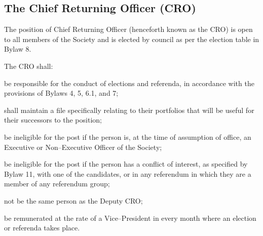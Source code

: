 \subsection {The Chief Returning Officer (CRO)}
\begin{longenum}[ label*=\thesubsection.\arabic*., align=left]
	\item The position of Chief Returning Officer (henceforth known as the CRO) is open to all members of the Society and is elected by council as per the election table in Bylaw 8.
    \item The CRO shall: 
    \begin{longenum}[ label*=\arabic*., align=left]
		\item  be responsible for the conduct of elections and referenda, in accordance with the provisions of Bylaws 4, 5, 6.1, and 7; 
		\item shall maintain a file specifically relating to their portfolios that will be useful for their successors to the position; 
        \item be ineligible for the post if the person is, at the time of assumption of office, an Executive or Non--Executive Officer of the Society; 
        \item be ineligible for the post if the person has a conflict of interest, as specified by Bylaw 11, with one of the candidates, or in any referendum in which they are a member of any referendum group;
        \item not be the same person as the Deputy CRO;
        \item be remunerated at the rate of a Vice--President in every month where an election or referenda takes place. 
        \end{longenum}
\end{longenum}

